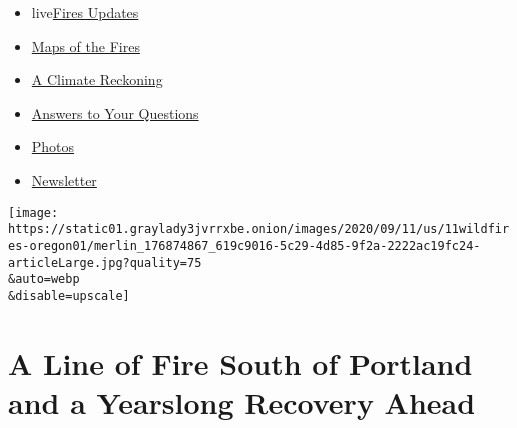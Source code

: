 \begin{itemize}
\tightlist
\item
  live\href{https://www.nytimes3xbfgragh.onion/2020/09/11/us/wildfires-live-updates.html?name=styln-california-wildfires\&region=TOP_BANNER\&block=storyline_menu_recirc\&action=click\&pgtype=Article\&impression_id=964aa141-f4b6-11ea-bc0c-2dd0f27298e1\&variant=undefined}{Fires
  Updates}
\item
  \href{https://www.nytimes3xbfgragh.onion/interactive/2020/us/fires-map-tracker.html?name=styln-california-wildfires\&region=TOP_BANNER\&block=storyline_menu_recirc\&action=click\&pgtype=Article\&impression_id=964aa142-f4b6-11ea-bc0c-2dd0f27298e1\&variant=undefined}{Maps
  of the Fires}
\item
  \href{https://www.nytimes3xbfgragh.onion/2020/09/10/us/climate-change-california-wildfires.html?name=styln-california-wildfires\&region=TOP_BANNER\&block=storyline_menu_recirc\&action=click\&pgtype=Article\&impression_id=964ac850-f4b6-11ea-bc0c-2dd0f27298e1\&variant=undefined}{A
  Climate Reckoning}
\item
  \href{https://www.nytimes3xbfgragh.onion/article/wildfires-california-oregon-washington.html?name=styln-california-wildfires\&region=TOP_BANNER\&block=storyline_menu_recirc\&action=click\&pgtype=Article\&impression_id=964ac851-f4b6-11ea-bc0c-2dd0f27298e1\&variant=undefined}{Answers
  to Your Questions}
\item
  \href{https://www.nytimes3xbfgragh.onion/article/wildfires-photos-california-oregon-washington-state.html?name=styln-california-wildfires\&region=TOP_BANNER\&block=storyline_menu_recirc\&action=click\&pgtype=Article\&impression_id=964ac852-f4b6-11ea-bc0c-2dd0f27298e1\&variant=undefined}{Photos}
\item
  \href{https://www.nytimes3xbfgragh.onion/2020/09/09/us/california-wildfires.html?name=styln-california-wildfires\&region=TOP_BANNER\&block=storyline_menu_recirc\&action=click\&pgtype=Article\&impression_id=964ac853-f4b6-11ea-bc0c-2dd0f27298e1\&variant=undefined}{Newsletter}
\end{itemize}

\texttt{[image: https://static01.graylady3jvrrxbe.onion/images/2020/09/11/us/11wildfires-oregon01/merlin\_176874867\_619c9016-5c29-4d85-9f2a-2222ac19fc24-articleLarge.jpg?quality=75\\\&auto=webp\\\&disable=upscale]}

\hypertarget{a-line-of-fire-south-of-portland-and-a-yearslong-recovery-ahead}{%
\section{A Line of Fire South of Portland and a Yearslong Recovery
Ahead}\label{a-line-of-fire-south-of-portland-and-a-yearslong-recovery-ahead}}

